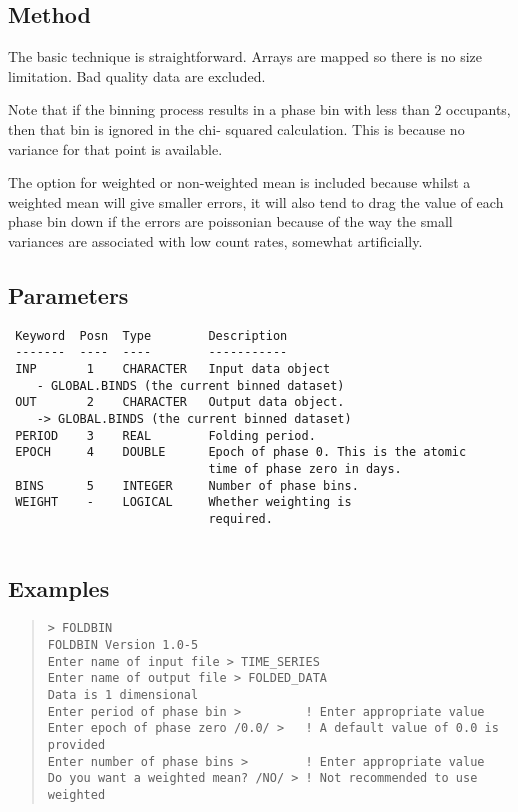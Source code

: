 \documentclass{book}
\renewcommand{\_}{{\tt\char'137}}     %
\begin{document}
\subsection{Method}
The basic technique is straightforward. Arrays are mapped so
there is no size limitation. Bad quality data are excluded.
 
Note that if the binning process results in a phase bin with
less than 2 occupants, then that bin is ignored in the chi-
squared calculation. This is because no variance for that
point is available.
 
The option for weighted or non-weighted mean is included
because whilst a weighted mean will give smaller errors,
it will also tend to drag the value of each phase bin down
if the errors are poissonian because of the way the small
variances are associated with low count rates, somewhat
artificially.
 
\subsection{Parameters}
\begin{verbatim}
 Keyword  Posn  Type        Description
 -------  ----  ----        -----------
 INP       1    CHARACTER   Input data object
    - GLOBAL.BINDS (the current binned dataset)
 OUT       2    CHARACTER   Output data object.
    -> GLOBAL.BINDS (the current binned dataset)
 PERIOD    3    REAL        Folding period.
 EPOCH     4    DOUBLE      Epoch of phase 0. This is the atomic
                            time of phase zero in days.
 BINS      5    INTEGER     Number of phase bins.
 WEIGHT    -    LOGICAL     Whether weighting is
                            required.
 
\end{verbatim}\subsection{Examples}
\begin{quote}\begin{verbatim}
> FOLDBIN
FOLDBIN Version 1.0-5
Enter name of input file > TIME_SERIES
Enter name of output file > FOLDED_DATA
Data is 1 dimensional
Enter period of phase bin >         ! Enter appropriate value
Enter epoch of phase zero /0.0/ >   ! A default value of 0.0 is provided
Enter number of phase bins >        ! Enter appropriate value
Do you want a weighted mean? /NO/ > ! Not recommended to use weighted
\end{verbatim}\end{quote}
\end{document}
